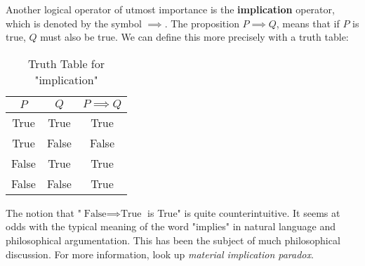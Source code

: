 Another logical operator of utmost importance is the \textbf{implication} operator,
which is denoted by the symbol \( \implies \). The proposition \( P \implies Q \),
means that if \( P \) is true, \( Q \) must also be true. We can define this more precisely
with a truth table:
\begin{table}[H]
  \centering
  \begin{tabular}{ccc}
    \toprule
    \(P\) & \(Q\) & \( P \implies Q \)  \\
    \midrule
    True & True & True \\
    True & False & False \\
    False & True & True \\
    False & False & True \\
    \bottomrule
  \end{tabular}
  \caption{Truth Table for "implication"}
\end{table}

\begin{advancedTopic}
  The notion that "\( \text{False} \implies \text{True} \) is True" is quite
  counterintuitive. It seems at odds with the typical meaning of the word "implies" in
  natural language and philosophical argumentation. This has been the subject of
  much philosophical discussion. For more information, look up \emph{material
  implication paradox}.
\end{advancedTopic}
